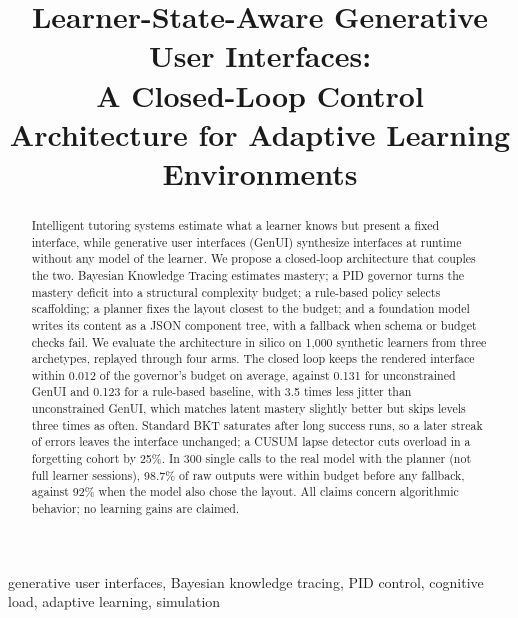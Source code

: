 \documentclass[conference]{IEEEtran}
\begin{document}
\title{Learner-State-Aware Generative User Interfaces:\\
A Closed-Loop Control Architecture for Adaptive Learning Environments}

\author{
}

\maketitle

\begin{abstract}
Intelligent tutoring systems estimate what a learner knows but present a
fixed interface, while generative user interfaces (GenUI) synthesize
interfaces at runtime without any model of the learner. We propose a
closed-loop architecture that couples the two. Bayesian Knowledge Tracing
estimates mastery; a PID governor turns the mastery deficit into a structural
complexity budget; a rule-based policy selects scaffolding; a planner fixes the
layout closest to the budget; and a foundation model writes its content as a
JSON component tree, with a fallback when schema or budget checks fail. We evaluate the architecture in silico on
1,000 synthetic learners from three archetypes, replayed through four arms.
The closed loop keeps the rendered interface within 0.012 of the governor's
budget on average, against 0.131 for unconstrained GenUI and 0.123 for a
rule-based baseline, with 3.5 times less jitter than unconstrained GenUI,
which matches latent mastery slightly better but skips levels three times as
often. Standard BKT saturates after long success runs, so a later streak of
errors leaves the interface unchanged; a CUSUM lapse detector cuts overload
in a forgetting cohort by 25\%. In 300 single calls to the real model with the
planner (not full learner sessions), 98.7\% of raw outputs were within budget before any fallback, against 92\% when the model
also chose the layout. All claims concern algorithmic behavior;
no learning gains are claimed.
\end{abstract}

\begin{IEEEkeywords}
generative user interfaces, Bayesian knowledge tracing, PID control,
cognitive load, adaptive learning, simulation
\end{IEEEkeywords}
\end{document}
